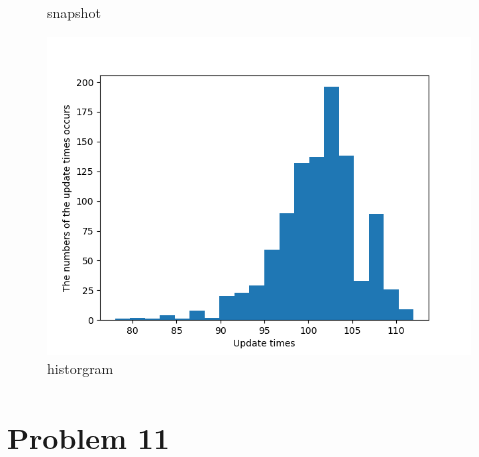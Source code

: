 \documentclass[12pt,a4paper]{article}
\begin{document}
\begin{figure}[hbp]
\begin{minipage}{0.48\linewidth}
        \caption{snapshot}
    \end{minipage}\hfil
    \begin{minipage}{0.48\linewidth}
        \centering
        \includegraphics[width = \linewidth]{Hw1P10.png}
        \caption{historgram}
    \end{minipage}\hfil
\end{figure}
\newpage
\section*{Problem 11}    
\end{document}
